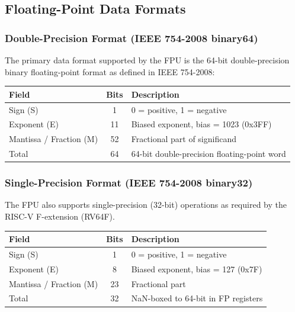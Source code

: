 \subsection{Floating-Point Data Formats}

\subsubsection{Double-Precision Format (IEEE 754-2008 binary64)}
The primary data format supported by the FPU is the 64-bit double-precision binary floating-point format as defined in IEEE 754-2008:

\begin{table}[H]
\centering
\begin{tabular}{|l|c|l|}
\hline
\textbf{Field} & \textbf{Bits} & \textbf{Description} \\ \hline
Sign (S) & 1 & 0 = positive, 1 = negative \\ \hline
Exponent (E) & 11 & Biased exponent, bias = 1023 (0x3FF) \\ \hline
Mantissa / Fraction (M) & 52 & Fractional part of significand \\ \hline
Total & 64 & 64-bit double-precision floating-point word \\ \hline
\end{tabular}
\end{table}

\subsubsection{Single-Precision Format (IEEE 754-2008 binary32)}
The FPU also supports single-precision (32-bit) operations as required by the RISC-V F-extension (RV64F).

\begin{table}[H]
\centering
\begin{tabular}{|l|c|l|}
\hline
\textbf{Field} & \textbf{Bits} & \textbf{Description} \\ \hline
Sign (S) & 1 & 0 = positive, 1 = negative \\ \hline
Exponent (E) & 8 & Biased exponent, bias = 127 (0x7F) \\ \hline
Mantissa / Fraction (M) & 23 & Fractional part \\ \hline
Total & 32 & NaN-boxed to 64-bit in FP registers \\ \hline
\end{tabular}
\end{table}

